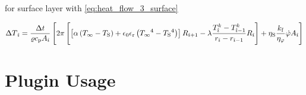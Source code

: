 \documentclass{scrartcl}
\begin{document}
    for surface layer with \autoref{eq:heat_flow_3_surface}

    \begin{equation}
        {\Delta T}_{\hat{\imath}} = \frac{{\Delta t}}{{\varrho}{c_\mathrm{p}}{A}_{\hat{\imath}}}
        \left[
        2 \pi \left[
            \left[ {\alpha} \left( {T_\infty} - {T_\mathrm{S}} \right) + {\epsilon_0}{\epsilon_\mathrm{r}}\left( {T_\infty}^4 - {T_\mathrm{S}}^4 \right) \right]
           {R}_{{\hat{\imath}}+1}
            -{\lambda} \frac{{T}_{{\hat{\imath}}}^{k} - {T}_{{\hat{\imath}}-1}^{k}}{{r}_{{\hat{\imath}}}-{r}_{{\hat{\imath}}-1}}
            {R}_{{\hat{\imath}}}
            \right]
        + {\eta_\mathrm{S}} \frac{{k_\mathrm{f}}}{{\eta_\varphi}} {\dot{\varphi}} {A}_{{\hat{\imath}}}
        \right]
        \label{eq:increment_surface}
    \end{equation}


    \section{Plugin Usage}\label{sec:plugin-usage}

    

    \printbibliography
\end{document}
